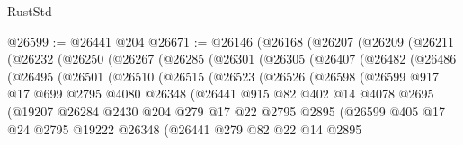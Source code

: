\begin{lexlean}{RustStd}
\begin{coremodule}
@26599 := @26441 @204
@26671 := @26146
    (@26168
      (@26207
        (@26209
          (@26211
            (@26232
              (@26250
                (@26267
                  (@26285
                    (@26301
                      (@26305
                        (@26407
                          (@26482
                            (@26486
                              (@26495
                                (@26501
                                  (@26510
                                    (@26515
                                      (@26523
                                        (@26526
                                          (@26598
                                            (@26599
                                              @917
                                              @17
                                              @699
                                              @2795
                                              @4080
                                              @26348
                                              (@26441
                                                @915
                                                @82
                                                @402
                                                @14
                                                @4078
                                                @2695
                                                (@19207
                                                  @26284
                                                  @2430
                                                  @204
                                                  @279
                                                  @17
                                                  @22
                                                  @2795
                                                  @2895
                                                  (@26599
                                                    @405
                                                    @17
                                                    @24
                                                    @2795
                                                    @19222
                                                    @26348
                                                    (@26441
                                                      @279
                                                      @82
                                                      @22
                                                      @14
                                                      @2895

\end{coremodule}
\end{lexlean}
